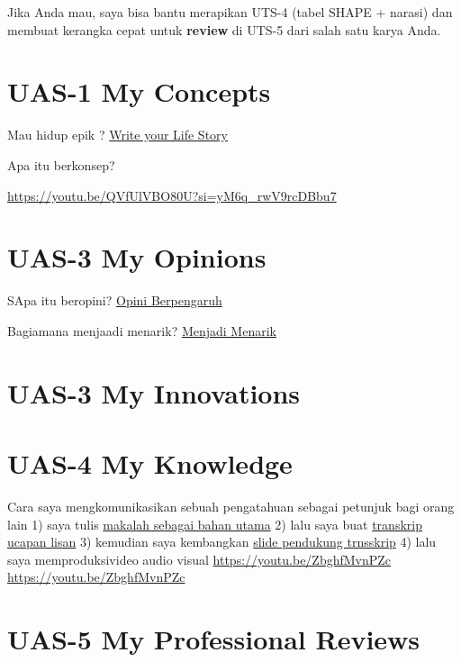 \documentclass[
  letterpaper,
  DIV=11,
  numbers=noendperiod]{scrreprt}
\begin{document}
Jika Anda mau, saya bisa bantu merapikan UTS-4 (tabel SHAPE + narasi)
dan membuat kerangka cepat untuk \textbf{review} di UTS-5 dari salah
satu karya Anda.


\chapter{UAS-1 My Concepts}\label{uas-1-my-concepts}

Mau hidup epik ? \href{lifestory.pdf}{Write your Life Story}

Apa itu berkonsep?

\url{https://youtu.be/QVfUlVBO80U?si=yM6q_rwV9rcDBbu7}


\chapter{UAS-3 My Opinions}\label{uas-3-my-opinions}

SApa itu beropini? \href{BM\%20Opini.mp4}{Opini Berpengaruh}

Bagiamana menjaadi menarik? \href{./Interesting.mp4}{Menjadi Menarik}


\chapter{UAS-3 My Innovations}\label{uas-3-my-innovations}


\chapter{UAS-4 My Knowledge}\label{uas-4-my-knowledge}

Cara saya mengkomunikasikan sebuah pengatahuan sebagai petunjuk bagi
orang lain 1) saya tulis
\href{Rekomendasi\%20Presentasi\%20Efektif(Contoh\%20Makalah).pdf}{makalah
sebagai bahan utama} 2) lalu saya buat
\href{Contoh\%20Transkrip\%20Presentasi.pdf}{transkrip ucapan lisan} 3)
kemudian saya kembangkan
\href{Rekomendasi\%20Presentasi\%20(Contoh\%20Slides).pdf}{slide
pendukung trnsskrip} 4) lalu saya memproduksivideo audio visual
\url{https://youtu.be/ZbghfMvnPZc} \url{https://youtu.be/ZbghfMvnPZc}


\chapter{UAS-5 My Professional
Reviews}\label{uas-5-my-professional-reviews}
\end{document}
